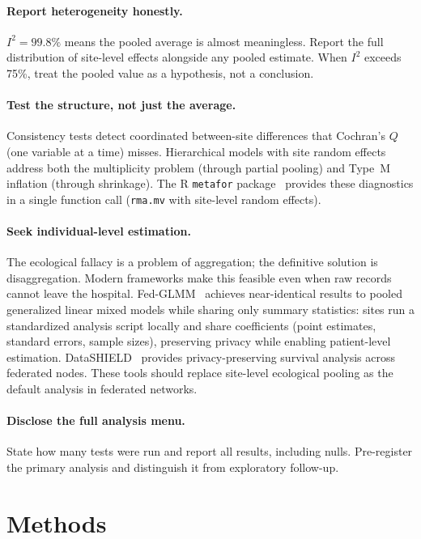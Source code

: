 \documentclass[11pt]{article}
\begin{document}
\paragraph{Report heterogeneity honestly.}
$I^2 = 99.8\%$ means the pooled average is almost meaningless.
Report the full distribution of site-level effects alongside any
pooled estimate.  When $I^2$ exceeds 75\%, treat the pooled value as a
hypothesis, not a conclusion.

\paragraph{Test the structure, not just the average.}
Consistency tests detect coordinated between-site differences that
Cochran's $Q$ (one variable at a time) misses.  Hierarchical models
with site random effects address both the multiplicity problem (through
partial pooling) and Type~M inflation (through shrinkage).  The R
\texttt{metafor} package~\cite{viechtbauer2010metafor} provides these
diagnostics in a single function call (\texttt{rma.mv} with site-level
random effects).

\paragraph{Seek individual-level estimation.}
The ecological fallacy is a problem of aggregation; the definitive
solution is disaggregation.  Modern frameworks make this feasible even
when raw records cannot leave the hospital.
Fed-GLMM~\cite{yan2023fedglmm} achieves near-identical results to
pooled generalized linear mixed models while sharing only summary
statistics: sites run a standardized analysis script locally and share
coefficients (point estimates, standard errors, sample sizes), preserving
privacy while enabling patient-level estimation.
DataSHIELD~\cite{banerjee2022dssurvival} provides privacy-preserving
survival analysis across federated nodes.  These tools should replace
site-level ecological pooling as the default analysis in federated
networks.

\paragraph{Disclose the full analysis menu.}
State how many tests were run and report all results, including nulls.
Pre-register the primary analysis and distinguish it from exploratory
follow-up.


\section{Methods}
\end{document}
